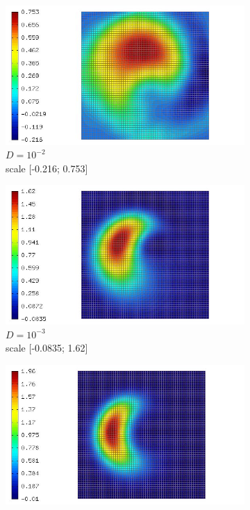 \documentclass[mathserif]{beamer}
\begin{document}
\begin{frame}
\begin{figure}[H]
\begin{subfigure}[H]{0.02\textwidth}
	\end{subfigure}
	\begin{subfigure}[H]{0.3\textwidth}
		\centering
		\includegraphics[width=.9\textwidth, trim = 65mm 0mm 0mm 0mm, clip]{images/timedep-multiscale/stability/eps=001_50.jpg}
		\vspace{-3mm}
		\caption{$D = 10^{-2}$\\\vspace{-2mm}scale [-0.216; 0.753]}
	\end{subfigure}
	\begin{subfigure}[H]{0.3\textwidth}
		\centering
		\includegraphics[width=.9\textwidth, trim = 65mm 0mm 0mm 0mm, clip]{images/timedep-multiscale/stability/eps=0001_50.jpg}
		\vspace{-3mm}
		\caption{$D = 10^{-3}$\\\vspace{-2mm}scale [-0.0835; 1.62]}
	\end{subfigure}
	\begin{subfigure}[H]{0.3\textwidth}
		\centering
		\includegraphics[width=.9\textwidth, trim = 65mm 0mm 0mm 0mm, clip]{images/timedep-multiscale/stability/eps=0_50.jpg}

\end{subfigure}
\end{figure}
\end{frame}
\end{document}
